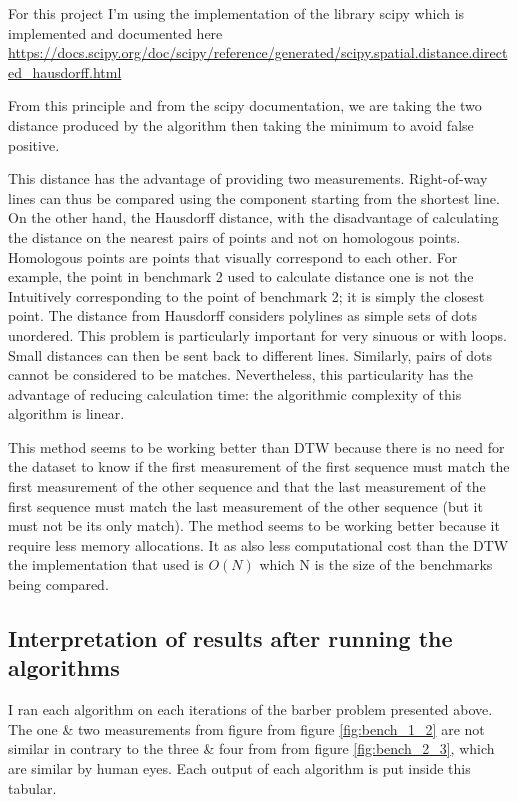 \documentclass{article}
\begin{document}
For this project I'm using the implementation of the library scipy which is implemented and documented here \url{https://docs.scipy.org/doc/scipy/reference/generated/scipy.spatial.distance.directed_hausdorff.html}

From this principle and from the scipy documentation, we are taking the two distance produced by the algorithm then taking the minimum to avoid false positive.

This distance has the advantage of providing two measurements. Right-of-way lines can thus be compared using the component starting from the shortest line. On the other hand, the Hausdorff distance, with the disadvantage of calculating the
distance on the nearest pairs of points and not on homologous points. Homologous points are points that visually correspond to each other. For example, the point in benchmark 2 used to calculate distance one is not the Intuitively corresponding to the point of benchmark 2; it is simply the closest point. The distance from Hausdorff considers polylines as simple sets of dots unordered. This problem is particularly important for very sinuous or with loops. Small distances can then be sent back to different lines. Similarly, pairs of dots cannot be considered to be matches. Nevertheless, this particularity has the advantage of reducing calculation time: the algorithmic complexity of this algorithm is linear. 


This method seems to be working better than DTW because there is no need for the dataset to know if the first measurement of the first sequence must match the first measurement of the other sequence and that the last measurement of the first sequence must match the last measurement of the other sequence (but it must not be its only match). The method seems to be working better because it require less memory allocations. It as also less computational cost than the DTW the implementation that used is $O(N)$ which N is the size of the benchmarks being compared.



\subsection{Interpretation of results after running the algorithms}

I ran each algorithm on each iterations of the barber problem presented above.
The one \& two measurements from figure from figure \ref{fig:bench_1_2}  are not similar in contrary to the three \& four from from figure \ref{fig:bench_2_3}, which are similar by human eyes.
Each output of each algorithm is put inside this tabular.
\end{document}
